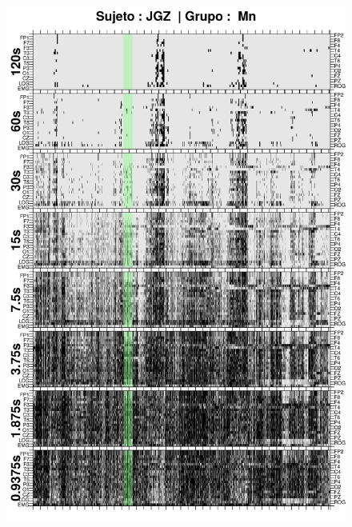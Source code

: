 \begin{figure}
\centering
\includegraphics[width=0.9\linewidth]
{./img_ejemplos/JGMN6SUE_comp_est_.png} 
\end{figure}

